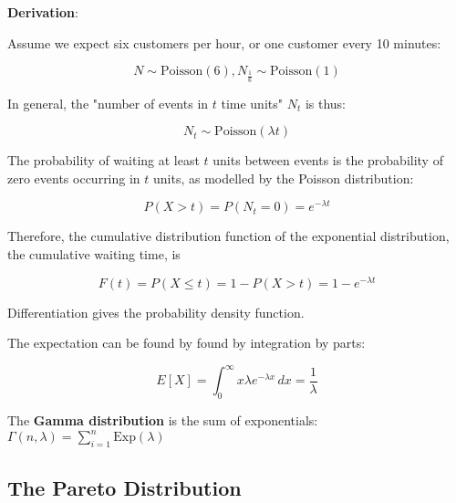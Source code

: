 \begin{paracol}{2}

\switchcolumn

\textbf{Derivation}:

Assume we expect six customers per hour, or one customer every 10 minutes:

$$N \sim \text{Poisson}(6), N_\frac{1}{6} \sim \text{Poisson}(1)$$

In general, the "number of events in $t$ time units" $N_t$ is thus:

$$N_t \sim \text{Poisson}(\lambda t)$$

The probability of waiting at least $t$ units between events is the probability of zero events occurring in $t$ units, as modelled by the Poisson distribution:

$$P(X > t) = P(N_t = 0) = e^{-\lambda t}$$

Therefore, the cumulative distribution function of the exponential distribution, the cumulative waiting time, is

$$F(t) = P(X \leq t) = 1 - P(X > t) = 1 - e^{-\lambda t}$$

Differentiation gives the probability density function.

The expectation can be found by found by integration by parts:

$$E[X] = \int_0^\infty x \lambda e^{-\lambda x} \,dx = \frac{1}{\lambda}$$

\end{paracol}

The \textbf{Gamma distribution} is the sum of exponentials: $\Gamma(n, \lambda) = \sum_{i=1}^n \text{Exp}(\lambda)$

\subsection{The Pareto Distribution}


